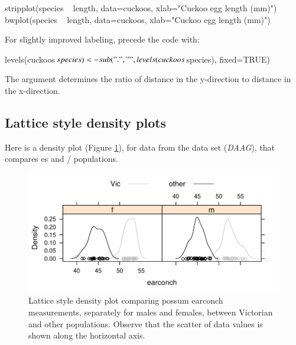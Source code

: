 \begin{Schunk}
\begin{Sinput}
stripplot(species ~ length, data=cuckoos,
          xlab="Cuckoo egg length (mm)")
bwplot(species ~ length, data=cuckoos,
       xlab="Cuckoo egg length (mm)")
\end{Sinput}
\end{Schunk}
\begin{marginfigure}[-36pt]
For slightly improved labeling, precede the code with:
\begin{Schunk}
\begin{Sinput}
levels(cuckoos$species) <-
 sub(".", " ",
  levels(cuckoos$species),
  fixed=TRUE)
\end{Sinput}
\end{Schunk}
\end{marginfigure}
The  argument determines the ratio of distance
in the y-direction to distance in the x-direction.

\subsection*{Lattice style density plots}
Here is a density plot (Figure \ref{fig:possumdens}), for data from
the  data set (\textit{DAAG}), that compares es
and / populations.
\begin{figure}
\begin{center}
\begin{Schunk}


\centerline{\includegraphics[width=\textwidth]{figs/07-lattice-density-1} }

\end{Schunk}
\end{center}
  \caption{Lattice style density plot comparing possum earconch
    measurements, separately for males and females, between Victorian
    and other populations. Observe that the scatter of data values is
shown along the horizontal axis.}\label{fig:possumdens}
\vspace*{-36pt}
\end{figure}

